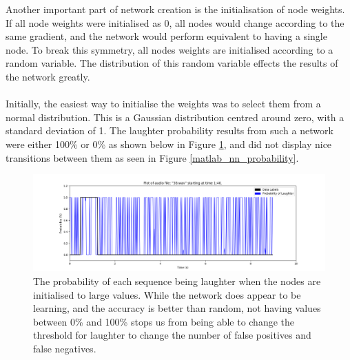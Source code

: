 \documentclass[a4paper,11pt,notitlepage]{article}
\begin{document}
Another important part of network creation is the initialisation of node weights. If all node weights were initialised as 0, all nodes would change according to the same gradient, and the network would perform equivalent to having a single node. To break this symmetry, all nodes weights are initialised according to a random variable. The distribution of this random variable effects the results of the network greatly.\\
\\
Initially, the easiest way to initialise the weights was to select them from a normal distribution. This is a Gaussian distribution centred around zero, with a standard deviation of 1. The laughter probability results from such a network were either 100\% or 0\% as shown below in Figure \ref{bad_initialisation1}, and did not display nice transitions between them as seen in Figure \ref{matlab_nn_probability}.

\begin{figure}[H]
	\centering
	\vspace{0.5cm}
	\includegraphics[scale = 0.4]{figs/bad_initialisation1.png}
	\caption{The probability of each sequence being laughter when the nodes are initialised to large values. While the network does appear to be learning, and the accuracy is better than random, not having values between 0\% and 100\% stops us from being able to change the threshold for laughter to change the number of false positives and false negatives.}
	\label{bad_initialisation1}
\end{figure}
\end{document}
